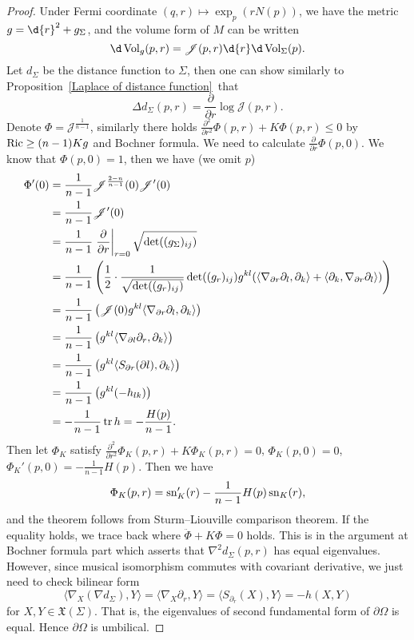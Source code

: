 \begin{proof}
    Under Fermi coordinate $(q,r)\mapsto\exp_p(rN(p))$, we have the metric $g=\d{r}^2+g_{\Sigma}$, and the volume form of $M$ can be written
    \[\d\Vol_g(p,r)=\mathscr{J}(p,r)\d{r}\d\Vol_{\Sigma}(p).\]
    Let $d_\Sigma$ be the distance function to $\Sigma$, then one can show similarly to Proposition~\ref{Laplace of distance function}~that
    \[\Delta d_\Sigma(p,r)=\frac{\partial{}}{\partial{r}}\log\mathscr{J}(p,r).\]
    Denote $\Phi=\mathscr{J}^{\frac{1}{n-1}}$, similarly there holds $\frac{\partial^2{}}{\partial{r^2}}\Phi(p,r)+K\Phi(p,r)\leq 0$ by $\operatorname{Ric}\geq(n-1)Kg$ and Bochner formula.
    We need to calculate $\frac{\partial{}}{\partial{r}}\Phi(p,0)$.
    We know that $\Phi(p,0)=1$, then we have (we omit $p$)
    \begin{align*}
        \Phi'(0)&=\frac{1}{n-1}\mathscr{J}^{\frac{2-n}{n-1}}(0)\mathscr{J}'(0)\\
        &=\frac{1}{n-1}\mathscr{J}'(0)\\
        &=\frac{1}{n-1}\left.\frac{\partial{}}{\partial{r}}\right|_{r=0}\sqrt{\det((g_\Sigma)_{ij})}\\
        &=\frac{1}{n-1}\left(\frac{1}{2}\cdot\frac{1}{\sqrt{\det((g_r)_{ij})}}\det((g_r)_{ij})g^{kl}(\langle\nabla_{\partial r}\partial_l,\partial_k\rangle+\langle\partial_k,\nabla_{\partial r}\partial_l\rangle)\right)\\
        &=\frac{1}{n-1}\left(\mathscr{J}(0)g^{kl}\langle\nabla_{\partial r}\partial_l,\partial_k\rangle\right)\\
        &=\frac{1}{n-1}\left(g^{kl}\langle\nabla_{\partial l}\partial_r,\partial_k\rangle\right)\\
        &=\frac{1}{n-1}\left(g^{kl}\langle S_{\partial r}(\partial l),\partial_k\rangle\right)\\
        &=\frac{1}{n-1}\left(g^{kl}(-h_{lk})\right)\\
        &=-\frac{1}{n-1}\operatorname{tr}{h}=-\frac{H(p)}{n-1}.
    \end{align*}
    Then let $\Phi_K$ satisfy $\frac{\partial^2{}}{\partial{r^2}}\Phi_K(p,r)+K\Phi_K(p,r)=0$, $\Phi_K(p,0)=0$, $\Phi_K'(p,0)=-\frac{1}{n-1}H(p)$.
    Then we have
    \[\Phi_K(p,r)=\operatorname{sn}_K'(r)-\frac{1}{n-1}H(p)\operatorname{sn}_K(r),\]
    and the theorem follows from Sturm--Liouville comparison theorem.
    If the equality holds, we trace back where $\ddot{\Phi}+K\Phi=0$ holds.
    This is in the argument at Bochner formula part which asserts that $\nabla^2d_\Sigma(p,r)$ has equal eigenvalues.
    However, since musical isomorphism commutes with covariant derivative, we just need to check bilinear form
    \[\langle\nabla_X(\nabla d_\Sigma),Y\rangle=\langle\nabla_X\partial_r,Y\rangle=\langle S_{\partial_r}(X),Y\rangle=-h(X,Y)\]
    for $X,Y\in\mathfrak{X}(\Sigma)$.
    That is, the eigenvalues of second fundamental form of $\partial\Omega$ is equal.
    Hence $\partial\Omega$ is umbilical.
\end{proof}

